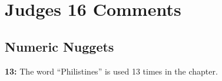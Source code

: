 \section{Judges 16 Comments}

\subsection{Numeric Nuggets}
\textbf{13: } The word ``Philistines'' is used 13 times in the chapter.

